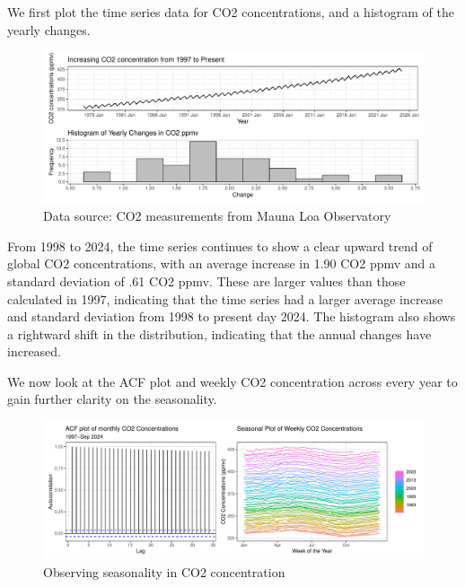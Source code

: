 \documentclass[
]{article}
\begin{document}
We first plot the time series data for CO2 concentrations, and a histogram of the yearly changes.

\begin{figure}

{\centering \includegraphics[width=1\linewidth]{lab_prompt_Updated_files/figure-latex/time-series-and-hist-two-1} 

}

\caption{Data source: CO2 measurements from Mauna Loa Observatory}\label{fig:time-series-and-hist-two}
\end{figure}

From 1998 to 2024, the time series continues to show a clear upward trend of global CO2 concentrations, with an average increase in 1.90 CO2 ppmv and a standard deviation of .61 CO2 ppmv. These are larger values than those calculated in 1997, indicating that the time series had a larger average increase and standard deviation from 1998 to present day 2024. The histogram also shows a rightward shift in the distribution, indicating that the annual changes have increased.

We now look at the ACF plot and weekly CO2 concentration across every year to gain further clarity on the seasonality.
\newpage

\begin{figure}

{\centering \includegraphics[width=1\linewidth]{lab_prompt_Updated_files/figure-latex/seasonality-eda-two-1} 

}

\caption{Observing seasonality in CO2 concentration}\label{fig:seasonality-eda-two}
\end{figure}
\end{document}
